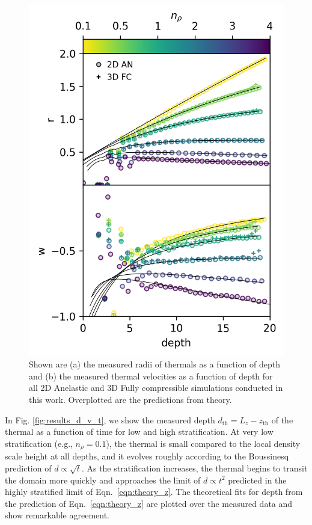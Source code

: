 \documentclass[twocolumn, amsmath, amsfonts, amssymb, trackchanges]{aastex62}
\begin{document}
\begin{figure}[t!]
    \includegraphics[width=\columnwidth]{results_panels_vs_depth.png}
    \caption{
	Shown are (a) the measured radii of thermals as a function of depth and (b) the measured thermal velocities as a function of depth for all 2D Anelastic and 3D Fully compressible simulations conducted in this work. 
	Overplotted are the predictions from theory.
    \label{fig:results_vs_depth} }
\end{figure}

In Fig. \ref{fig:results_d_v_t}, we show the measured depth $d_{\text{th}} = L_z - z_{\text{th}}$ of the thermal as a function of time for low and high stratification. 
At very low stratification (e.g., $n_\rho = 0.1$), the thermal is small compared to the local density scale height at all depths, and it evolves roughly according to the Boussinesq prediction of $d \propto \sqrt{t}$. 
As the stratification increases, the thermal begins to transit the domain more quickly and approaches the limit of $d \propto t^2$ predicted in the highly stratified limit of Eqn.~\ref{eqn:theory_z}. 
The theoretical fits for depth from the prediction of Eqn.~\ref{eqn:theory_z} are plotted over the measured data and show remarkable agreement.
\end{document}
